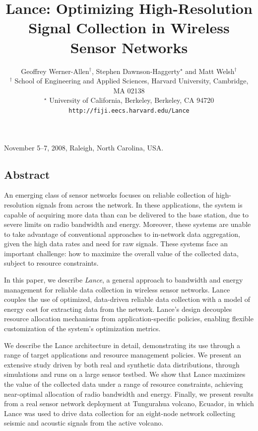 \documentclass[lettersize]{sig-alternate-konrad}
\begin{document}
 {November 5--7, 2008, Raleigh, North Carolina, USA.} 

\title{{\ttlfnt Lance: Optimizing High-Resolution Signal Collection
in Wireless Sensor Networks}}
\author{\alignauthor Geoffrey Werner-Allen$^\dag$, Stephen
Dawnson-Haggerty$^\star$ and Matt Welsh$^\dag$\\
{\affaddr $^\dag$ School of Engineering and
Applied Sciences, Harvard
University, Cambridge, MA 02138} \\
{\affaddr $^\star$ University of California, Berkeley, Berkeley, CA 94720} \\
{\affaddr \texttt{http://fiji.eecs.harvard.edu/Lance}}}
\maketitle

\maketitle
\thispagestyle{empty}

\subsection*{Abstract}
An emerging class of sensor networks focuses on reliable 
collection of high-resolution signals from across the network.
In these applications, the system is capable of acquiring more 
data than can be delivered to the base station, 
due to severe limits on radio bandwidth and energy.
Moreover, these systems are unable 
to take advantage of conventional approaches to in-network data
aggregation, given the high data rates and need for raw signals.
These systems face an important challenge: how to
maximize the overall value of the collected data, subject to resource constraints.

In this paper, we describe {\em Lance}, a general approach to
bandwidth and energy management for reliable data collection in wireless
sensor networks. Lance couples the use of optimized, data-driven 
reliable data collection with a model of energy cost for extracting 
data from the network. Lance's design decouples resource allocation 
mechanisms from application-specific policies, enabling flexible 
customization of the system's optimization metrics.

We describe the Lance architecture in detail, demonstrating its
use through a range of target applications and resource management
policies. We present an extensive study driven by both 
real and synthetic data distributions, through simulations and runs
on a large sensor testbed.  We show that Lance maximizes 
the value of the collected data under a range of resource 
constraints, achieving near-optimal allocation of radio bandwidth and
energy. Finally, we present results from a real sensor network
deployment at Tungurahua volcano, Ecuador, in which Lance was used to
drive data collection for an eight-node network collecting seismic and
acoustic signals from the active volcano.  
\end{document}
